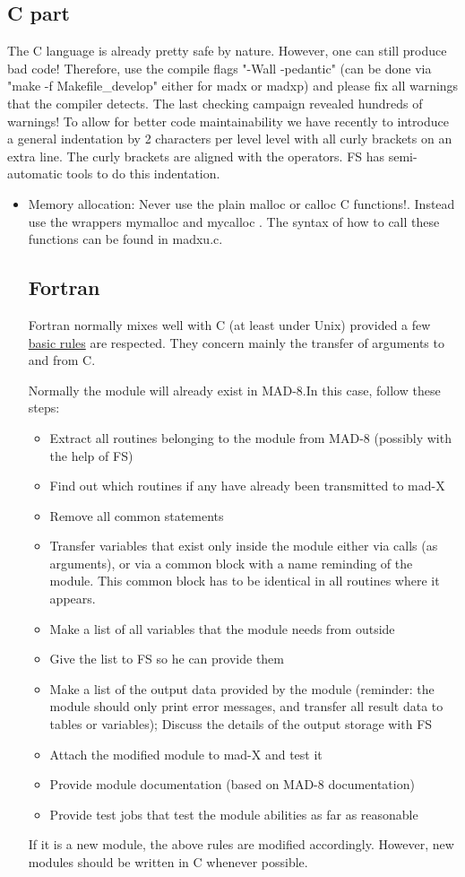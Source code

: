 \subsection{C part} The C language is already pretty safe by nature. However, one can still produce bad code! Therefore, use the compile flags "-Wall -pedantic" (can be done via "make -f Makefile\_develop" either for madx or madxp) and please fix all warnings that the compiler detects. The last checking campaign revealed hundreds of warnings! To allow for better code maintainability we have recently to introduce a general indentation by 2 characters per level level with all curly brackets on an extra line. The curly brackets are aligned with the operators. FS has semi-automatic tools to do this indentation. 
\begin{itemize}
	\item  Memory allocation: Never use the plain malloc or calloc C functions!. Instead use the wrappers  mymalloc and mycalloc . The syntax of how to call these functions can be found in madxu.c. 

\subsection{Fortran} Fortran normally mixes well with C (at least under Unix) provided a few \href{fortran-rules.html}{basic rules} are respected. They concern mainly the transfer of arguments to and from C. 

 Normally the module will already exist in MAD-8.In this case, follow these steps: 
\begin{itemize}
	\item Extract all routines belonging to the module from MAD-8 (possibly with the help of FS) 
	\item Find out which routines if any have already been transmitted to mad-X 
	\item Remove all common statements 
	\item Transfer variables that exist only inside the module either via calls (as arguments), or via a common block with a name reminding of the module. This common block has to be identical in all routines where it appears. 
	\item Make a list of all variables that the module needs from outside 
	\item Give the list to FS so he can provide them 
	\item Make a list of the output data provided by the module (reminder: the module should only print error messages,  and transfer all result data to tables or variables); Discuss the details of the output storage with FS 
	\item Attach the modified module to mad-X and test it 
	\item Provide module documentation (based on MAD-8 documentation) 
	\item Provide test jobs that test the module abilities as far as reasonable 
\end{itemize} If it is a new module, the above rules are modified accordingly. However, new modules should be written in C whenever possible. 




\end{itemize}
